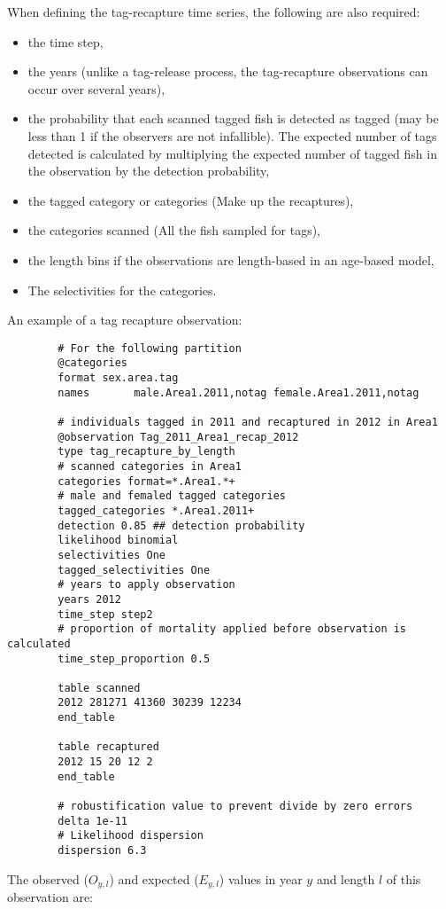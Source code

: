 When defining the tag-recapture time series, the following are also required:

\begin{itemize}
	\item the time step,
	\item the years (unlike a tag-release process, the tag-recapture observations can occur over several years),
	\item the probability that each scanned tagged fish is detected as tagged (may be less than 1 if the observers are not infallible). The expected number of tags detected is calculated by multiplying the expected number of tagged fish in the observation by the detection probability,
	\item the tagged category or categories (Make up the recaptures),
	\item the categories scanned (All the fish sampled for tags),
	\item the length bins if the observations are length-based in an age-based model,
	\item The selectivities for the categories. 
\end{itemize}

An example of a tag recapture observation:

{\small{\begin{verbatim}
		# For the following partition
		@categories
		format sex.area.tag
		names  		male.Area1.2011,notag female.Area1.2011,notag
		
		# individuals tagged in 2011 and recaptured in 2012 in Area1
		@observation Tag_2011_Area1_recap_2012
		type tag_recapture_by_length
		# scanned categories in Area1
		categories format=*.Area1.*+
		# male and femaled tagged categories
		tagged_categories *.Area1.2011+
		detection 0.85 ## detection probability
		likelihood binomial
		selectivities One
		tagged_selectivities One
		# years to apply observation
		years 2012
		time_step step2
		# proportion of mortality applied before observation is calculated
		time_step_proportion 0.5
		
		table scanned
		2012 281271 41360 30239 12234
		end_table
		
		table recaptured
		2012 15 20 12 2
		end_table
		
		# robustification value to prevent divide by zero errors
		delta 1e-11
		# Likelihood dispersion
		dispersion 6.3
		\end{verbatim}}}

The observed ($O_{y,l}$) and expected ($E_{y,l}$) values in year $y$ and length $l$ of this observation are:


